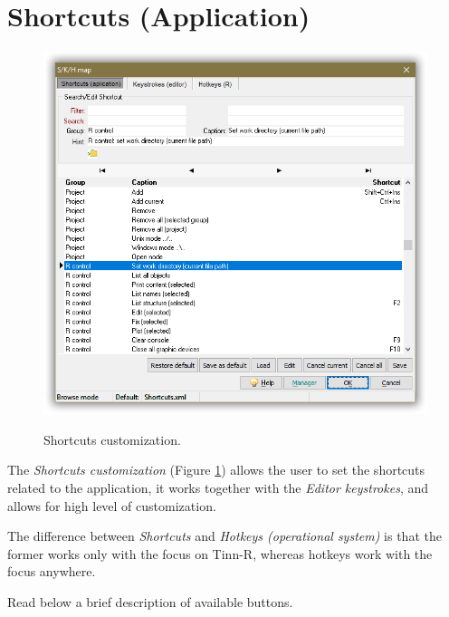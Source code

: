 
\hypertarget{working_shortcuts}{}
\section{Shortcuts (Application)}

\begin{figure}[H]
  \includegraphics[scale=0.40]{./res/shortcuts_dlg.png}\\
  \caption{Shortcuts customization.}
  \label{fig:shortcuts_dlg_1}
\end{figure}

The \textit{Shortcuts customization}
(Figure \ref{fig:shortcuts_dlg_1})
allows the user to set the shortcuts related
to the application, it works together with the \textit{Editor keystrokes},
and allows for high level of customization.

The difference between \textit{Shortcuts} and \textit{Hotkeys (operational system)}
is that the former works only with the focus on Tinn-R, whereas hotkeys work
with the focus anywhere.

Read below a brief description of available buttons.

